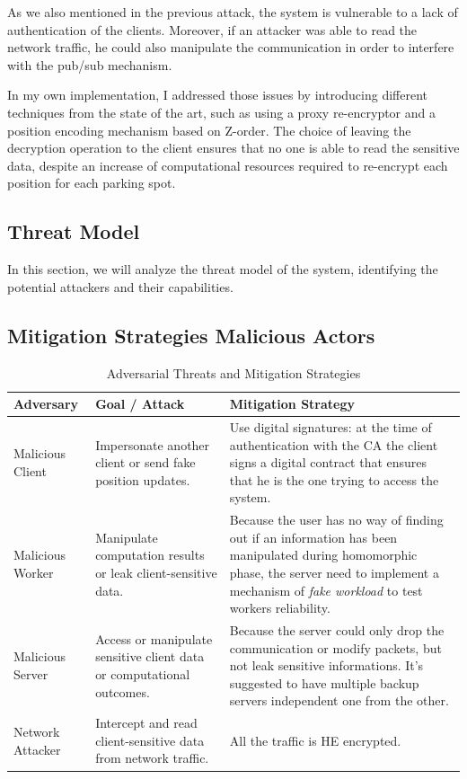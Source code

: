 As we also mentioned in the previous attack, the system is vulnerable to a lack of authentication of the clients. Moreover, if an attacker was able to read the network traffic, he could also manipulate the communication in order to interfere with the pub/sub mechanism.

In my own implementation, I addressed those issues by introducing different techniques from the state of the art, such as using a proxy re-encryptor and a position encoding mechanism based on Z-order. The choice of leaving the decryption operation to the client ensures that no one is able to read the sensitive data, despite an increase of computational resources required to re-encrypt each position for each parking spot.

\subsection{Threat Model} \label{subsec:threatmodel}

In this section, we will analyze the threat model of the system, identifying the potential attackers and their capabilities. 


\subsection{Mitigation Strategies Malicious Actors}

\begin{table}[h]
\renewcommand{\arraystretch}{1.3}
\small
\begin{tabularx}{\linewidth}{|l|X|X|}
\hline
\textbf{Adversary} & \textbf{Goal / Attack} & \textbf{Mitigation Strategy} \\ \hline

Malicious Client &
Impersonate another client or send fake position updates. &
Use digital signatures: at the time of authentication with the CA the client signs a digital contract that ensures that he is the one trying to access the system. \\ \hline

Malicious Worker &
Manipulate computation results or leak client-sensitive data. &
Because the user has no way of finding out if an information has been manipulated during homomorphic phase, the server need to implement a mechanism of \emph{fake workload} to test workers reliability. \\ \hline

Malicious Server &
Access or manipulate sensitive client data or computational outcomes. &
Because the server could only drop the communication or modify packets, but not leak sensitive informations. It's suggested to have multiple backup servers independent one from the other. \\ \hline

Network Attacker &
Intercept and read client-sensitive data from network traffic. &
All the traffic is HE encrypted. \\ \hline

\end{tabularx}
\caption{Adversarial Threats and Mitigation Strategies}
\label{table:adversaries}
\end{table}

